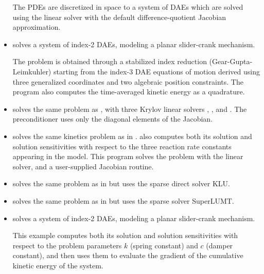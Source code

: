\begin{itemize}
  The PDEs are discretized in space to a system of DAEs which are solved
  using the {\sunlinsolband} linear solver with the default difference-quotient 
  Jacobian approximation.

\item {}
  solves a system of index-2 DAEs, modeling a planar slider-crank mechanism.

  The problem is obtained through a stabilized index reduction (Gear-Gupta-Leimkuhler)
  starting from the index-3 DAE equations of motion derived using three generalized
  coordinates and two algebraic position constraints.
  The program also computes the time-averaged kinetic energy as a quadrature.

\item {}
  solves the same problem as , with three Krylov linear solvers
  {\sunlinsolspgmr}, {\sunlinsolspbcgs}, and {\sunlinsolsptfqmr}.  The preconditioner uses only
  the diagonal elements of the Jacobian.


\item {}
  solves the same kinetics problem as in .
  \newline
  {\idas} also computes both its solution and solution sensitivities with respect
  to the three reaction rate constants appearing in the model. 
  This program solves the problem with the {\sunlinsoldense} linear solver, and a 
  user-supplied Jacobian routine.

\item {}
  solves the same problem as in  but uses
  the sparse direct solver KLU.

\item {}
  solves the same problem as in  but uses
  the sparse solver SuperLUMT.

\item {}
  solves a system of index-2 DAEs, modeling a planar slider-crank mechanism.

  This example computes both its solution and solution sensitivities with respect
  to the problem parameters $k$ (spring constant) and $c$ (damper constant), 
  and then uses them to evaluate the gradient of the cumulative kinetic energy
  of the system.



\end{itemize}

